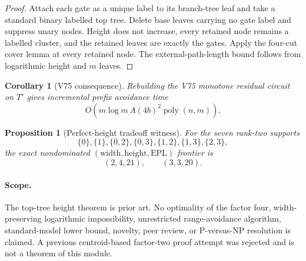 \documentclass[11pt]{article}
\newtheorem{proposition}{Proposition}
\newtheorem{corollary}{Corollary}
\begin{document}
\begin{proof}
Attach each gate as a unique label to its branch-tree leaf and take a standard
binary labelled top tree. Delete base leaves carrying no gate label and
suppress unary nodes. Height does not increase, every retained node remains a
labelled cluster, and the retained leaves are exactly the gates. Apply the
four-cut cover lemma at every retained node. The external-path-length bound
follows from logarithmic height and $m$ leaves.
\end{proof}

\begin{corollary}[V75 consequence]
Rebuilding the V75 monotone residual circuit on $T'$ gives incremental prefix
avoidance time
\[
 O\!\left(m\log m\,A(4b)^2\operatorname{poly}(n,m)\right).
\]
\end{corollary}

\begin{proposition}[Perfect-height tradeoff witness]
For the seven rank-two supports
\[
 \{0\},\{1\},\{0,2\},\{0,3\},\{1,2\},\{1,3\},\{2,3\},
\]
the exact nondominated $(\mathrm{width},\mathrm{height},\mathrm{EPL})$ frontier
is
\[
 (2,4,21),\qquad (3,3,20).
\]
\end{proposition}

\paragraph{Scope.}
The top-tree height theorem is prior art. No optimality of the factor four,
width-preserving logarithmic impossibility, unrestricted range-avoidance
algorithm, standard-model lower bound, novelty, peer review, or P-versus-NP
resolution is claimed. A previous centroid-based factor-two proof attempt was
rejected and is not a theorem of this module.
\end{document}

